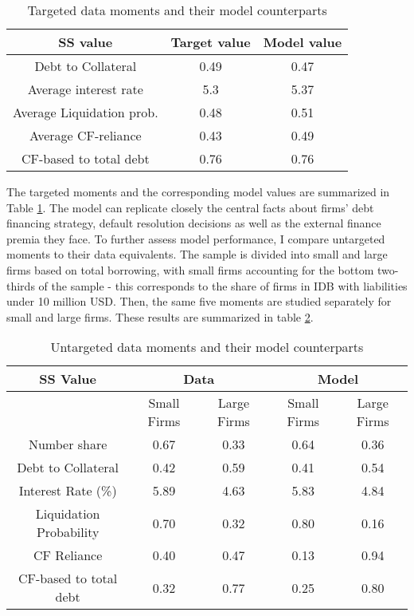 \documentclass[12pt]{article}
\begin{document}
\begin{table}[h!]
    \centering
    \begin{tabular}{c|c|c}
    \toprule
    \textbf{SS value} & \textbf{Target value} & \textbf{Model value} \\ 
    \midrule
    Debt to Collateral & 0.49 & 0.47 \\ 
    Average interest rate & 5.3 & 5.37 \\ 
    Average Liquidation prob. & 0.48 & 0.51 \\ 
    Average CF-reliance & 0.43 & 0.49 \\ 
   CF-based to total debt & 0.76 & 0.76 \\ 
    \bottomrule
    \end{tabular}
    \caption{Targeted data moments and their model counterparts}
    \label{tab:targets}
\end{table}

\noindent The targeted moments and the corresponding model values are summarized in Table \ref{tab:targets}. The model can replicate closely the central facts about firms' debt financing strategy, default resolution decisions as well as the external finance premia they face. To further assess model performance, I compare untargeted moments to their data equivalents. The sample is divided into small and large firms based on total borrowing, with small firms accounting for the bottom two-thirds of the sample - this corresponds to the share of firms in IDB with liabilities under 10 million USD. Then, the same five moments are studied separately for small and large firms. These results are summarized in table \ref{tab:untargeted}.

\begin{table}[h!]
    \centering
    \begin{tabular}{c|c|c||c|c}
    \textbf{SS Value} &  \multicolumn{2}{c}{\textbf{Data}} & \multicolumn{2}{c}{\textbf{Model}} \\ 
    \toprule
     & Small Firms & Large Firms & Small Firms & Large Firms  \\ 
    \midrule
    Number share & 0.67 & 0.33 & 0.64 & 0.36 \\ 
    Debt to Collateral & 0.42 & 0.59 & 0.41 & 0.54 \\ 
    Interest Rate (\%) & 5.89 & 4.63 & 5.83 & 4.84 \\ 
    Liquidation Probability & 0.70 & 0.32 & 0.80 & 0.16 \\ 
    CF Reliance & 0.40 & 0.47 & 0.13 & 0.94 \\ 
    CF-based to total debt & 0.32 & 0.77 & 0.25 & 0.80 \\ 
    \bottomrule
    \end{tabular}
    \caption{Untargeted data moments and their model counterparts}
    \label{tab:untargeted}
\end{table}
\end{document}
